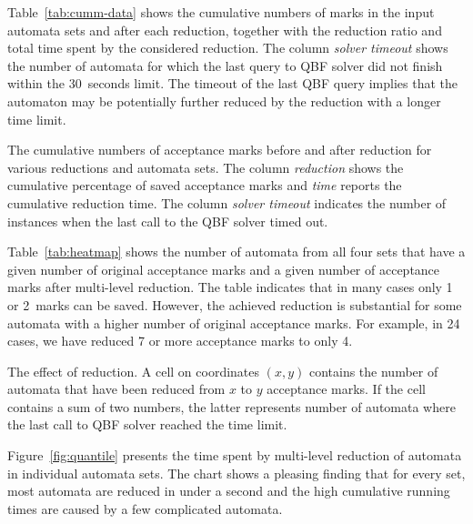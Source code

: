 \documentclass[a4paper,UKenglish,cleveref,autoref,thm-restate]{lipics-v2021}
\begin{document}
Table~\ref{tab:cumm-data} shows the cumulative numbers of marks in
the input automata sets and after each reduction, together with the
reduction ratio and total time spent by the considered reduction. The
column \textit{solver timeout} shows the number of automata for which
the last query to QBF solver did not finish within the 30~seconds
limit. The timeout of the last QBF query implies that the automaton
may be potentially further reduced by the reduction with a longer time
limit.

\begin{table}[t]
  \caption{The cumulative numbers of acceptance marks before and after
    reduction for various reductions and automata sets. The column
    \emph{reduction} shows the cumulative percentage of saved
    acceptance marks and \emph{time} reports the cumulative reduction
    time. The column \textit{solver timeout} indicates the number of
    instances when the last call to the QBF solver timed out.  }
\label{tab:cumm-data}
\centering
\setlength{\tabcolsep}{10pt}

\end{table}

Table~\ref{tab:heatmap} shows the number of automata from all
four sets that have a given number of original acceptance marks and a
given number of acceptance marks after multi-level reduction. The
table indicates that in many cases only 1 or 2~marks can be
saved. However, the achieved reduction is substantial for some
automata with a higher number of original acceptance marks. For
example, in 24 cases, we have reduced 7 or more
acceptance marks to only 4.

\begin{table}[t]
\caption{The effect of reduction.
A cell on coordinates $(x,y)$ contains the number of automata that have been
reduced from $x$ to $y$ acceptance marks. If the cell contains a sum of two
numbers, the latter represents number of automata where the last call to QBF
solver reached the time limit.}
\label{tab:heatmap}
\setlength{\tabcolsep}{2.5pt}
\centering

\end{table}

Figure~\ref{fig:quantile} presents the time spent by multi-level
reduction of automata in individual automata sets. The chart shows a
pleasing finding that for every set, most automata are reduced in
under a second and the high cumulative running times are caused by
a few complicated automata.
\end{document}
